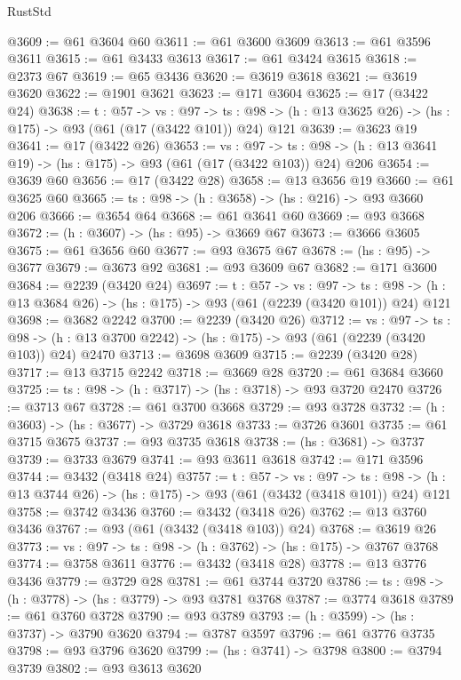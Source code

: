 \begin{lexlean}{RustStd}
\begin{coremodule}
@3609 := @61 @3604 @60
@3611 := @61 @3600 @3609
@3613 := @61 @3596 @3611
@3615 := @61 @3433 @3613
@3617 := @61 @3424 @3615
@3618 := @2373 @67
@3619 := @65 @3436
@3620 := @3619 @3618
@3621 := @3619 @3620
@3622 := @1901 @3621
@3623 := @171 @3604
@3625 := @17 (@3422 @24)
@3638 := {t : @57} ->
  {vs : @97} ->
  {ts : @98} -> (h : @13 @3625 @26) -> (hs : @175) -> @93 (@61 (@17 (@3422 @101)) @24) @121
@3639 := @3623 @19
@3641 := @17 (@3422 @26)
@3653 := {vs : @97} ->
  {ts : @98} -> (h : @13 @3641 @19) -> (hs : @175) -> @93 (@61 (@17 (@3422 @103)) @24) @206
@3654 := @3639 @60
@3656 := @17 (@3422 @28)
@3658 := @13 @3656 @19
@3660 := @61 @3625 @60
@3665 := {ts : @98} -> (h : @3658) -> (hs : @216) -> @93 @3660 @206
@3666 := @3654 @64
@3668 := @61 @3641 @60
@3669 := @93 @3668
@3672 := (h : @3607) -> (hs : @95) -> @3669 @67
@3673 := @3666 @3605
@3675 := @61 @3656 @60
@3677 := @93 @3675 @67
@3678 := (hs : @95) -> @3677
@3679 := @3673 @92
@3681 := @93 @3609 @67
@3682 := @171 @3600
@3684 := @2239 (@3420 @24)
@3697 := {t : @57} ->
  {vs : @97} ->
  {ts : @98} -> (h : @13 @3684 @26) -> (hs : @175) -> @93 (@61 (@2239 (@3420 @101)) @24) @121
@3698 := @3682 @2242
@3700 := @2239 (@3420 @26)
@3712 := {vs : @97} ->
  {ts : @98} -> (h : @13 @3700 @2242) -> (hs : @175) -> @93 (@61 (@2239 (@3420 @103)) @24) @2470
@3713 := @3698 @3609
@3715 := @2239 (@3420 @28)
@3717 := @13 @3715 @2242
@3718 := @3669 @28
@3720 := @61 @3684 @3660
@3725 := {ts : @98} -> (h : @3717) -> (hs : @3718) -> @93 @3720 @2470
@3726 := @3713 @67
@3728 := @61 @3700 @3668
@3729 := @93 @3728
@3732 := (h : @3603) -> (hs : @3677) -> @3729 @3618
@3733 := @3726 @3601
@3735 := @61 @3715 @3675
@3737 := @93 @3735 @3618
@3738 := (hs : @3681) -> @3737
@3739 := @3733 @3679
@3741 := @93 @3611 @3618
@3742 := @171 @3596
@3744 := @3432 (@3418 @24)
@3757 := {t : @57} ->
  {vs : @97} ->
  {ts : @98} -> (h : @13 @3744 @26) -> (hs : @175) -> @93 (@61 (@3432 (@3418 @101)) @24) @121
@3758 := @3742 @3436
@3760 := @3432 (@3418 @26)
@3762 := @13 @3760 @3436
@3767 := @93 (@61 (@3432 (@3418 @103)) @24)
@3768 := @3619 @26
@3773 := {vs : @97} -> {ts : @98} -> (h : @3762) -> (hs : @175) -> @3767 @3768
@3774 := @3758 @3611
@3776 := @3432 (@3418 @28)
@3778 := @13 @3776 @3436
@3779 := @3729 @28
@3781 := @61 @3744 @3720
@3786 := {ts : @98} -> (h : @3778) -> (hs : @3779) -> @93 @3781 @3768
@3787 := @3774 @3618
@3789 := @61 @3760 @3728
@3790 := @93 @3789
@3793 := (h : @3599) -> (hs : @3737) -> @3790 @3620
@3794 := @3787 @3597
@3796 := @61 @3776 @3735
@3798 := @93 @3796 @3620
@3799 := (hs : @3741) -> @3798
@3800 := @3794 @3739
@3802 := @93 @3613 @3620

\end{coremodule}
\end{lexlean}
